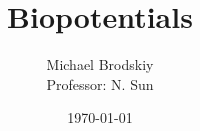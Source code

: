 


\title{Biopotentials}
\date{\today}
\author{Michael Brodskiy\\ \small Professor: N. Sun}



\maketitle

